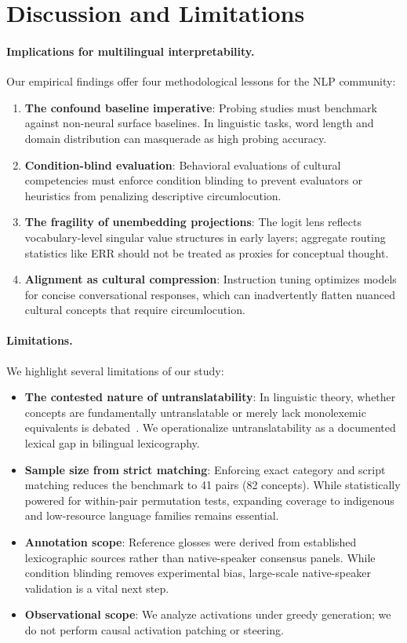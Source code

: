 \documentclass{article}
\begin{document}
\section{Discussion and Limitations}

\paragraph{Implications for multilingual interpretability.}
Our empirical findings offer four methodological lessons for the NLP community:
\begin{enumerate}
    \item \textbf{The confound baseline imperative}: Probing studies must benchmark against non-neural surface baselines. In linguistic tasks, word length and domain distribution can masquerade as high probing accuracy.
    \item \textbf{Condition-blind evaluation}: Behavioral evaluations of cultural competencies must enforce condition blinding to prevent evaluators or heuristics from penalizing descriptive circumlocution.
    \item \textbf{The fragility of unembedding projections}: The logit lens reflects vocabulary-level singular value structures in early layers; aggregate routing statistics like ERR should not be treated as proxies for conceptual thought.
    \item \textbf{Alignment as cultural compression}: Instruction tuning optimizes models for concise conversational responses, which can inadvertently flatten nuanced cultural concepts that require circumlocution.
\end{enumerate}

\paragraph{Limitations.}
We highlight several limitations of our study:
\begin{itemize}
    \item \textbf{The contested nature of untranslatability}: In linguistic theory, whether concepts are fundamentally untranslatable or merely lack monolexemic equivalents is debated~\cite{sapir1929,brown1954study}. We operationalize untranslatability as a documented lexical gap in bilingual lexicography.
    \item \textbf{Sample size from strict matching}: Enforcing exact category and script matching reduces the benchmark to 41 pairs (82 concepts). While statistically powered for within-pair permutation tests, expanding coverage to indigenous and low-resource language families remains essential.
    \item \textbf{Annotation scope}: Reference glosses were derived from established lexicographic sources rather than native-speaker consensus panels. While condition blinding removes experimental bias, large-scale native-speaker validation is a vital next step.
    \item \textbf{Observational scope}: We analyze activations under greedy generation; we do not perform causal activation patching or steering.
\end{itemize}
\end{document}
